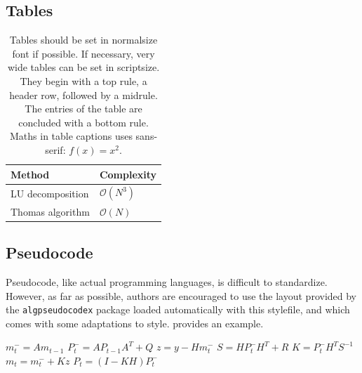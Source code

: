 \documentclass{article}
\begin{document}
\subsection{Tables}


\begin{table}[b]\centering
\caption{Tables should be set in normalsize font if possible. If necessary, very wide tables can be set in scriptsize. They begin with a top rule, a header row, followed by a midrule. The entries of the table are concluded with a bottom rule. Maths in table captions uses sans-serif: $f(x) = x^2.$}
    \begin{tabular}{ll}
        \toprule
        Method           & Complexity         \\
        \midrule
        LU decomposition & $\mathcal{O}(N^3)$ \\
        Thomas algorithm & $\mathcal{O}(N)$   \\
        \bottomrule
    \end{tabular}
    \label{tab:1}
\end{table}

\subsection{Pseudocode}

Pseudocode, like actual programming languages, is difficult to standardize. However, as far as possible, authors are encouraged to use the layout provided by the \texttt{algpseudocodex} package loaded automatically with this stylefile, and which comes with some adaptations to style.  provides an example.

\begin{algorithm}
    \begin{algorithmic}[1]
         
        \State $m^- _{t} = A m_{t-1}$ 
        \State $P^- _{t} = A P_{t-1} A ^T + Q$ 
        \State $z = y - H m_t ^{-}$ 
        \State $S = H P_t ^- H^T + R$ 
        \State $K = P_t ^- H ^T S ^{-1}$ 
        \State $m_t = m_t ^- + Kz$ 
        \State $P_t = (I - KH) P_t ^-$ 
        \EndFor
        \State {}
        \EndProcedure
    \end{algorithmic}
    \caption{An example algorithm (the Kalman filter). Note the line numbers and sans-serif maths in captions: $f(x) = x^2$.}
    \label{alg:1}
\end{algorithm}
\end{document}

